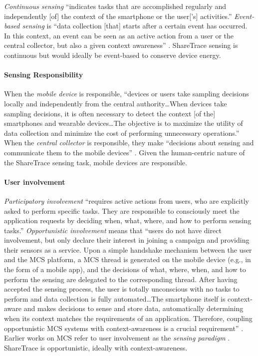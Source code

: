 \emph{Continuous sensing} ``indicates tasks that are accomplished regularly and independently [of] the context of the smartphone or the user['s] activities.'' \emph{Event-based sensing} is ``data collection [that] starts after a certain event has occurred. In this context, an event can be seen as an active action from a user or the central collector, but also a given context awareness'' \cite{Capponi2019}. ShareTrace sensing is continuous but would ideally be event-based to conserve device energy.

\paragraph{Sensing Responsibility}

When the \emph{mobile device} is responsible, ``devices or users take sampling decisions locally and independently from the central authority{\ldots}When devices take sampling decisions, it is often necessary to detect the context [of the] smartphones and wearable devices{\ldots}The objective is to maximize the utility of data collection and minimize the cost of performing unnecessary operations.'' When the \emph{central collector} is responsible, they make ``decisions about sensing and communicate them to the mobile devices'' \cite{Capponi2019}. Given the human-centric nature of the ShareTrace sensing task, mobile devices are responsible.

\paragraph{User involvement}

\emph{Participatory involvement} ``requires active actions from users, who are explicitly asked to perform specific tasks. They are responsible to consciously meet the application requests by deciding when, what, where, and how to perform sensing tasks.'' \emph{Opportunistic involvement} means that ``users do not have direct involvement, but only declare their interest in joining a campaign and providing their sensors as a service. Upon a simple handshake mechanism between the user and the MCS platform, a MCS thread is generated on the mobile device (e.g., in the form of a mobile app), and the decisions of what, where, when, and how to perform the sensing are delegated to the corresponding thread. After having accepted the sensing process, the user is totally unconscious with no tasks to perform and data collection is fully automated{\ldots}The smartphone itself is context-aware and makes decisions to sense and store data, automatically determining when its context matches the requirements of an application. Therefore, coupling opportunistic MCS systems with context-awareness is a crucial requirement'' \cite{Capponi2019}. Earlier works on MCS refer to user involvement as the \emph{sensing paradigm} \cite{Lane2010, Ganti2011, Ma2014}. ShareTrace is opportunistic, ideally with context-awareness.

